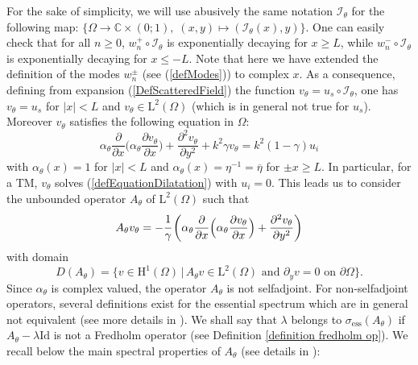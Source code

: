 \documentclass[11pt,a4paper]{report}
\newcommand{\Om}{\Omega}
\newcommand{\mrm}[1]{\mathrm{#1}}
\newcommand{\Cplx}{\mathbb{C}}
\newcommand{\mL}{\mrm{L}}
\newcommand{\mH}{\mrm{H}}
\begin{document}
For the sake of simplicity, we  will use abusively the same notation $\mathcal{I}_{\theta}$ for the following map:
$\{\Om \to \Cplx\times(0;1), \;
(x,y) \mapsto (\mathcal{I}_{\theta}(x),y)\}$.
One can easily check that for all $n\geq 0$, 
$w_n^+\circ \mathcal{I}_{\theta}$ is exponentially decaying for $x\ge L$, while $w_n^-\circ \mathcal{I}_{\theta}$ is exponentially decaying for $x\le-L$. Note that here we have extended the definition of the modes $w_n^\pm$ (see (\ref{defModes})) to complex $x$.
As a consequence, defining from expansion (\ref{DefScatteredField})  the function $v_{\theta}=u_s\circ \mathcal{I}_{\theta}$, one has $v_{\theta}=u_s$ for $|x|< L$ and $v_{\theta}\in \mL^2(\Omega)$ (which is in general not true for $u_s$). Moreover $v_{\theta}$ satisfies the following equation in $\Om$:
\begin{equation}\label{defEquationDilatation}
\alpha_{\theta}\frac{\partial}{\partial x}\Big(\alpha_{\theta}\frac{\partial v_{\theta}}{\partial x}\Big)+\frac{\partial^2 v_{\theta}}{\partial y^2}+k^2\gamma v_{\theta}=k^2(1-\gamma)u_i
\end{equation}
with $\alpha_{\theta}(x)=1$ for $|x|<L$ and $\alpha_{\theta}(x)=\eta^{-1}=\overline{\eta}$ for $\pm x\ge L$. In particular, for a TM, $v_{\theta}$ solves (\ref{defEquationDilatation}) with $u_i=0$. This leads us to consider the unbounded operator $A_{\theta}$ of $\mL^2(\Om)$ such that
\begin{equation}\label{defOpClassicalPMLs}
A_{\theta}v_{\theta}=-\cfrac{1}{\gamma}\left(\alpha_{\theta}\frac{\partial}{\partial x}\Big(\alpha_{\theta}\frac{\partial v_{\theta}}{\partial x}\Big)+\frac{\partial^2 v_{\theta}}{\partial y^2}\right)
\end{equation}
with domain
\[
D(A_{\theta})=\{v\in\mH^1(\Om)\,|\,A_{\theta}v\in \mL^2(\Om)\mbox{ and }\partial_{y}v=0\mbox{ on }\partial\Om\}.
\]
Since $\alpha_{\theta}$ is complex valued, the operator $A_{\theta}$ is not selfadjoint. For non-selfadjoint operators, several definitions exist for the essential spectrum which are in general not equivalent (see more details in \cite{EdEv87}). We shall say that $\lambda$ belongs to $\sigma_{\mrm{ess}}(A_{\theta})$ if $A_{\theta}-\lambda\mrm{Id}$ is not a Fredholm operator (see Definition \ref{definition fredholm op}). We recall below the main spectral properties of $A_{\theta}$ (see details in \cite{Simo78}):
\end{document}
